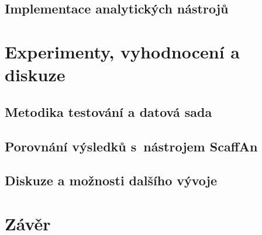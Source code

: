 \documentclass[czech, bc, kky, he, iso690alph, pdf]{fasthesis}
\begin{document}
\section{Implementace analytických nástrojů}

%
\chapter{Experimenty, vyhodnocení a diskuze}

\section{Metodika testování a datová sada}

\section{Porovnání výsledků s~nástrojem ScaffAn}

\section{Diskuze a možnosti dalšího vývoje}

%
\chapter{Závěr}


%
\appendix
\end{document}
